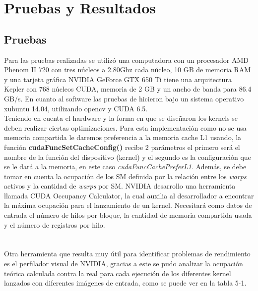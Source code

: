 \chapter{Pruebas y Resultados}
\section{Pruebas}
Para las pruebas realizadas se utilizó una computadora con un procesador AMD Phenom II 720 con tres núcleos a 2.80Ghz cada núcleo, 10 GB de memoria RAM y una tarjeta gráfica NVIDIA GeForce GTX 650 Ti tiene una arquitectura Kepler con 768 núcleos CUDA, memoria de 2 GB y un ancho de banda para 86.4 GB/s. En cuanto al software las pruebas de hicieron bajo un sistema operativo xubuntu 14.04, utilizando opencv y CUDA 6.5.\\
Teniendo en cuenta el hardware y la forma en que se diseñaron los kernels se deben realizar ciertas optimizaciones. Para esta implementación como no se usa memoria compartida le daremos preferencia a la memoria cache L1 usando, la función \textbf{cudaFuncSetCacheConfig()} recibe 2 parámetros el primero será el nombre de la función del dispositivo (kernel) y el segundo es la configuración que se le dará a la memoria, en este caso \textit{cudaFuncCachePreferL1}. Además, se debe tomar en cuenta la ocupación de los SM definida por la relación entre los \textit{warps} activos y la cantidad de \textit{warps} por SM. NVIDIA desarrollo una herramienta llamada CUDA Occupancy Calculator\cite{calc}, la cual auxilia al desarrollador a encontrar la máxima ocupación para el lanzamiento de un kernel. Necesitará como datos de entrada el número de hilos por bloque, la cantidad de memoria compartida usada y el número de registros por hilo.\\\\\\
Otra herramienta que resulta muy útil para identificar problemas de rendimiento es el perfilador visual de NVIDIA\cite{profile}, gracias a este se pudo analizar la ocupación teórica calculada contra la real para cada ejecución de los diferentes kernel lanzados con diferentes imágenes de entrada, como se puede ver en la tabla 5-1.\\
